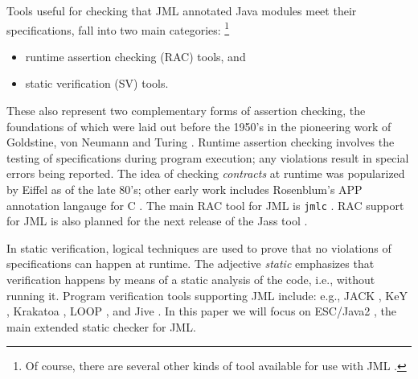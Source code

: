 \documentclass{llncs}
\begin{document}
Tools useful for checking that JML annotated Java modules meet their
specifications, fall into two main categories:%
%
\footnote{Of course, there are several other kinds of tool available for use
  with JML \cite{STTT05}.}
%
\begin{itemize}
  \item runtime assertion checking (RAC) tools, and
  \item static verification (SV) tools.
\end{itemize}
%
These also represent two complementary forms of assertion checking, the
foundations of which were laid out before the 1950's in the pioneering work
of Goldstine, von Neumann and Turing \cite{Jones03}.
%
Runtime assertion checking involves the testing of specifications during
program execution; any violations result in special errors being reported.
%
The idea of checking \emph{contracts} at runtime
was popularized by Eiffel \cite{Meyer97} as of the late 80's; other early work includes
Rosenblum's APP annotation langauge for C \cite{Rosenblum92,Rosenblum95}.
%
The main RAC tool for JML is \texttt{jmlc} \cite{Cheon-Leavens02b}.
RAC support for JML is also planned for the next release of the Jass tool
\cite{Bartetzko-etal01}.

In static verification,
logical techniques are used to prove that no violations of
specifications can happen at runtime.
The adjective \emph{static\/} emphasizes that verification
happens by means of a static analysis of the code, i.e., without running it.
%
%
Program verification tools supporting JML include: e.g., JACK \cite{JACK}, KeY
\cite{KeY}, Krakatoa \cite{Krakatoa}, LOOP \cite{LOOP}, and Jive
\cite{Jive00}.  In this paper we will focus on ESC/Java2 \cite{Cok-Kiniry04},
the main extended static checker for JML.
\end{document}
